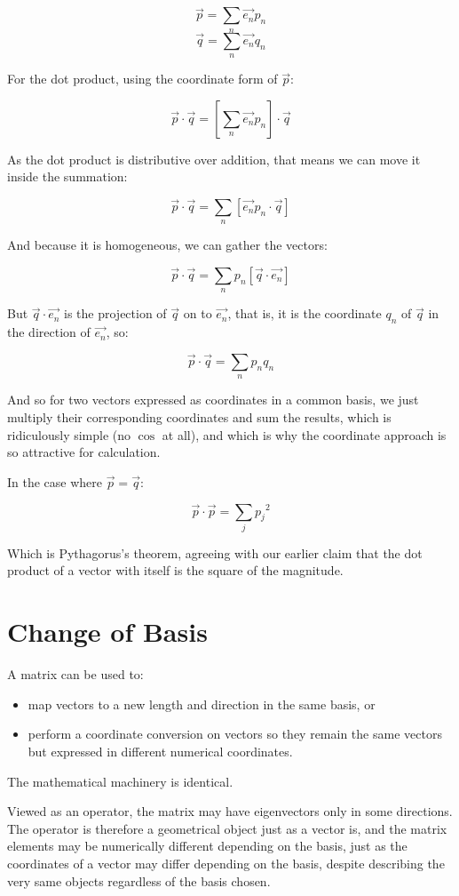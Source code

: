 $$\vec{p} = \sum_n \vec{e_n}p_n$$
$$\vec{q} = \sum_n \vec{e_n}q_n$$

For the dot product, using the coordinate form of $\vec{p}$:

$$
\vec{p}\cdot\vec{q} =
\left[ \sum_n{\vec{e_n}p_n} \right] \cdot \vec{q}
$$

As the dot product is distributive over addition, that means we can move it inside the summation:

$$
\vec{p}\cdot\vec{q} =
\sum_n \left[ \vec{e_n} p_n \cdot \vec{q} \right]
$$

And because it is homogeneous, we can gather the vectors:

$$
\vec{p}\cdot\vec{q} =
\sum_n p_n \left[ \vec{q} \cdot \vec{e_n} \right]
$$

But $\vec{q} \cdot \vec{e_n}$ is the projection of $\vec{q}$ on to $\vec{e_n}$, that is, it is the coordinate $q_n$ of $\vec{q}$ in the direction of $\vec{e_n}$, so:

$$
\vec{p}\cdot\vec{q} = \sum_n p_nq_n
$$

And so for two vectors expressed as coordinates in a common basis, we just multiply their corresponding coordinates and sum the results, which is ridiculously simple (no $\cos$ at all), and which is why the coordinate approach is so attractive for calculation.

In the case where $\vec{p} = \vec{q}$:

$$
\vec{p}\cdot\vec{p} = \sum_j {p_j}^2
$$

Which is Pythagorus's theorem, agreeing with our earlier claim that the dot product of a vector with itself is the square of the magnitude.

\section{Change of Basis}\label{sec:vectors-change-basis}

A matrix can be used to:

\begin{itemize}
    \item map vectors to a new length and direction in the same basis, or
    \item perform a coordinate conversion on vectors so they remain the same vectors but expressed in different numerical coordinates.
\end{itemize}

The mathematical machinery is identical.

Viewed as an operator, the matrix may have eigenvectors only in some directions. The operator is therefore a geometrical object just as a vector is, and the matrix elements may be numerically different depending on the basis, just as the coordinates of a vector may differ depending on the basis, despite describing the very same objects regardless of the basis chosen.

